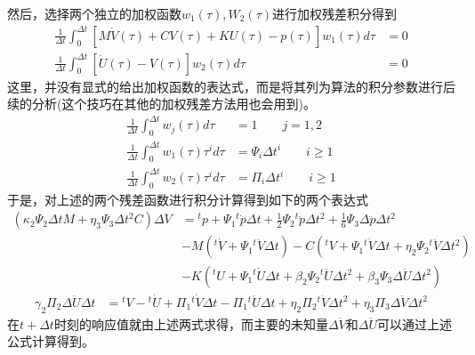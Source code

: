 然后，选择两个独立的加权函数$w_1(\tau),W_2(\tau)$进行加权残差积分得到
\begin{align}
\frac{1}{\Delta t}\int_0^{\Delta t}[M\dot{V}(\tau)+CV(\tau)+KU(\tau)-p(\tau)]w_1(\tau)d\tau&=0\\
\frac{1}{\Delta t}\int_0^{\Delta t}[\dot{U}(\tau)-V(\tau)]w_2(\tau)d\tau&=0
\end{align}
这里，并没有显式的给出加权函数的表达式，而是将其列为算法的积分参数进行后续的分析(这个技巧在其他的加权残差方法用也会用到)。
\begin{equation}
\begin{aligned}
\frac{1}{\Delta t}\int_0^{\Delta t}w_j(\tau)d\tau&=1\qquad j=1,2\\
\frac{1}{\Delta t}\int_0^{\Delta t}w_1(\tau)\tau^id\tau&=\Psi_i\Delta t^i\qquad i\ge1\\
\frac{1}{\Delta t}\int_0^{\Delta t}w_2(\tau)\tau^id\tau&=\Pi_i\Delta t^i\qquad i\ge1
\end{aligned}
\end{equation}
于是，对上述的两个残差函数进行积分计算得到如下的两个表达式
\begin{equation}
\begin{aligned}
(\kappa_2\Psi_2\Delta tM+\eta_3\Psi_3\Delta t^2C)\Delta\ddot{V}&={^t\!p}+\Psi_1{^t\!\dot{p}}\Delta t+\frac12\Psi_2{^t\!\ddot{p}}\Delta t^2+\frac16\Psi_3\Delta\ddot{p}\Delta t^2\\
&-M({^t\!\dot{V}}+\Psi_1{^t\!\ddot{V}}\Delta t)-C({^t\!V}+\Psi_1{^t\!\dot{V}}\Delta t+\eta_2\Psi_2{^t\!\ddot{V}}\Delta t^2)\\
&-K({^t\!U}+\Psi_1{^t\!\dot{U}}\Delta t+\beta_2\Psi_2{^t\!\ddot{U}}\Delta t^2+\beta_3\Psi_3\Delta\ddot{U}\Delta t^2)
\end{aligned}
\end{equation}
\vspace{-0.5cm}
\begin{equation}
\begin{aligned}
\gamma_2\Pi_2\Delta\ddot{U}\Delta t&={^t\!V}-{^t\!\dot{U}}+\Pi_1{^t\!\dot{V}}\Delta t-\Pi_1{^t\!\ddot{U}}\Delta t+\eta_2\Pi_2{^t\!\ddot{V}}\Delta t^2+\eta_3\Pi_3\Delta\ddot{V}\Delta t^2
\end{aligned}
\end{equation}
在$t+\Delta t$时刻的响应值就由上述两式求得，而主要的未知量$\Delta\ddot{V}$和$\Delta\ddot{U}$可以通过上述公式计算得到。

